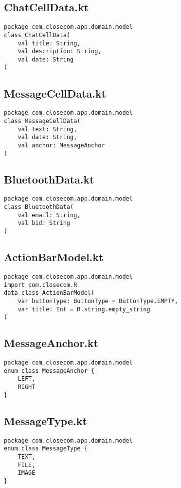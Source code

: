 \documentclass[listing]{espd}
\begin{document}
\subsection{ChatCellData.kt}
\begin{verbatim}
package com.closecom.app.domain.model
class ChatCellData(
    val title: String,
    val description: String,
    val date: String
)
\end{verbatim}

\subsection{MessageCellData.kt}
\begin{verbatim}
package com.closecom.app.domain.model
class MessageCellData(
    val text: String,
    val date: String,
    val anchor: MessageAnchor
)
\end{verbatim}

\subsection{BluetoothData.kt}
\begin{verbatim}
package com.closecom.app.domain.model
class BluetoothData(
    val email: String,
    val bid: String
)
\end{verbatim}

\subsection{ActionBarModel.kt}
\begin{verbatim}
package com.closecom.app.domain.model
import com.closecom.R
data class ActionBarModel(
    var buttonType: ButtonType = ButtonType.EMPTY,
    var title: Int = R.string.empty_string
)
\end{verbatim}

\subsection{MessageAnchor.kt}
\begin{verbatim}
package com.closecom.app.domain.model
enum class MessageAnchor {
    LEFT,
    RIGHT
}
\end{verbatim}

\subsection{MessageType.kt}
\begin{verbatim}
package com.closecom.app.domain.model
enum class MessageType {
    TEXT,
    FILE,
    IMAGE
}
\end{verbatim}
\end{document}
